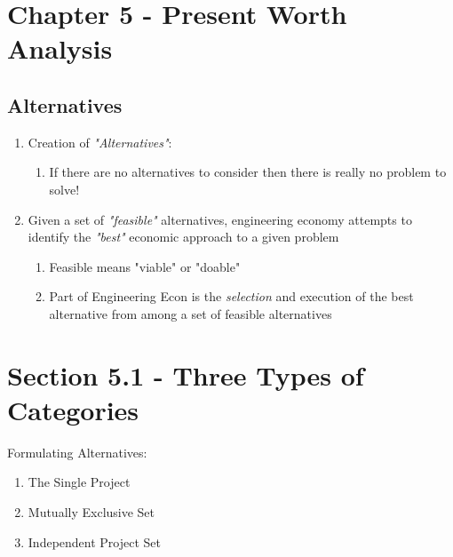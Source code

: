 \documentclass{report} %
\begin{document}
\section*{Chapter 5 - Present Worth Analysis}
\subsection*{Alternatives}
\begin{enumerate}
    \item Creation of \emph{"Alternatives"}:
        \begin{enumerate}
            \item If there are no alternatives to consider then there is really no problem to solve!
        \end{enumerate}
    \item Given a set of \emph{"feasible"} alternatives, engineering economy attempts to identify the \emph{"best"} economic approach to a given problem
        \begin{enumerate}
            \item Feasible means "viable" or "doable"
            \item Part of Engineering Econ is the \emph{selection} and execution of the best alternative from among a set of feasible alternatives
        \end{enumerate}
\end{enumerate}
\section*{Section 5.1 - Three Types of Categories}
Formulating Alternatives:
\begin{enumerate}
    \item The Single Project
    \item Mutually Exclusive Set
    \item Independent Project Set
\end{enumerate}
\end{document}

